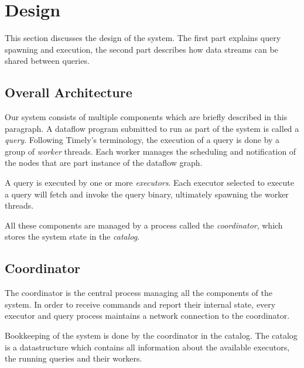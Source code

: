 \chapter{Design}\label{ch:design}

This section discusses the design of the system. The first part explains query
spawning and execution, the second part describes how data streams can be shared
between queries.

\section{Overall Architecture}

Our system consists of multiple components which are briefly described in this
paragraph. A dataflow program submitted to run as part of the system is
called a \emph{query}. Following Timely's terminology, the execution of a query
is done by a group of \emph{worker} threads. Each worker manages the scheduling and
notification of the nodes that are part instance of the dataflow graph. 

A query is executed by one or more \emph{executors}. Each executor selected to
execute a query will fetch and invoke the query binary, ultimately spawning the
worker threads. 

All these components are managed by a process called the \emph{coordinator},
which stores the system state in the \emph{catalog}.

\section{Coordinator}

The coordinator is the central process managing all the components
of the system. In order to receive commands and report their internal state,
every executor and query process maintains a network connection to the coordinator.

Bookkeeping of the system is done by the coordinator in the catalog. The
catalog is a datastructure which contains all information about the available
executors, the running queries and their workers. 

